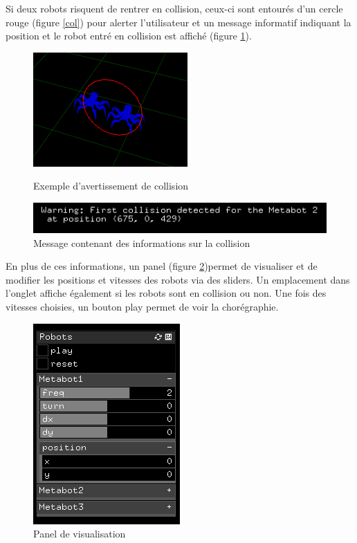 Si deux robots risquent de rentrer en collision, ceux-ci sont entourés d'un cercle rouge (figure \ref{col}) pour alerter l'utilisateur et un message informatif indiquant la position et le robot entré en collision est affiché (figure \ref{mcol}).

\begin{figure}[htbp]
\begin{minipage}[c]{.45\linewidth}
\begin{center}
\includegraphics[scale=0.45]{imgs/collision}
\caption{Exemple d'avertissement de collision}
\label{col}
\end{center}
\end{minipage}
\hspace*{0.5cm}
\begin{minipage}[c]{.5\linewidth}
\begin{center}
\includegraphics[scale=0.6]{imgs/mcollision}
\caption{Message contenant des informations sur la collision}
\label{mcol}
\end{center}
\end{minipage}
\end{figure}

En plus de ces informations, un panel (figure \ref{pan})permet de visualiser et de modifier les positions et vitesses des robots via des sliders. Un emplacement dans l'onglet affiche également si les robots sont en collision ou non. Une fois des vitesses choisies, un bouton play permet de voir la chorégraphie. 

\begin{figure}[H]
\centering
\includegraphics[scale=0.6]{imgs/panel2}
\caption{Panel de visualisation}
\label{pan}
\end{figure}

